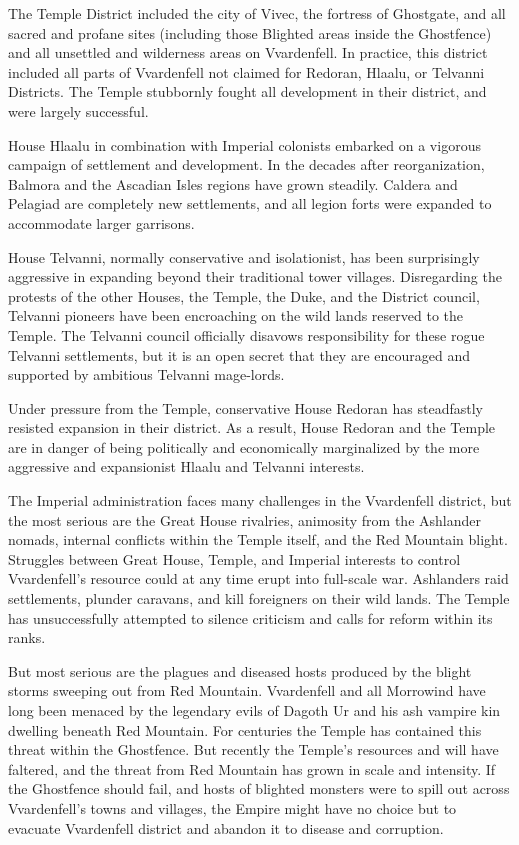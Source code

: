 The Temple District included the city of Vivec, the fortress of Ghostgate, and all sacred and profane sites (including those Blighted areas inside the Ghostfence) and all unsettled and wilderness areas on Vvardenfell. In practice, this district included all parts of Vvardenfell not claimed for Redoran, Hlaalu, or Telvanni Districts. The Temple stubbornly fought all development in their district, and were largely successful.

House Hlaalu in combination with Imperial colonists embarked on a vigorous campaign of settlement and development. In the decades after reorganization, Balmora and the Ascadian Isles regions have grown steadily. Caldera and Pelagiad are completely new settlements, and all legion forts were expanded to accommodate larger garrisons.

House Telvanni, normally conservative and isolationist, has been surprisingly aggressive in expanding beyond their traditional tower villages. Disregarding the protests of the other Houses, the Temple, the Duke, and the District council, Telvanni pioneers have been encroaching on the wild lands reserved to the Temple. The Telvanni council officially disavows responsibility for these rogue Telvanni settlements, but it is an open secret that they are encouraged and supported by ambitious Telvanni mage-lords.

Under pressure from the Temple, conservative House Redoran has steadfastly resisted expansion in their district. As a result, House Redoran and the Temple are in danger of being politically and economically marginalized by the more aggressive and expansionist Hlaalu and Telvanni interests.

The Imperial administration faces many challenges in the Vvardenfell district, but the most serious are the Great House rivalries, animosity from the Ashlander nomads, internal conflicts within the Temple itself, and the Red Mountain blight. Struggles between Great House, Temple, and Imperial interests to control Vvardenfell's resource could at any time erupt into full-scale war. Ashlanders raid settlements, plunder caravans, and kill foreigners on their wild lands. The Temple has unsuccessfully attempted to silence criticism and calls for reform within its ranks.

But most serious are the plagues and diseased hosts produced by the blight storms sweeping out from Red Mountain. Vvardenfell and all Morrowind have long been menaced by the legendary evils of Dagoth Ur and his ash vampire kin dwelling beneath Red Mountain. For centuries the Temple has contained this threat within the Ghostfence. But recently the Temple's resources and will have faltered, and the threat from Red Mountain has grown in scale and intensity. If the Ghostfence should fail, and hosts of blighted monsters were to spill out across Vvardenfell's towns and villages, the Empire might have no choice but to evacuate Vvardenfell district and abandon it to disease and corruption.